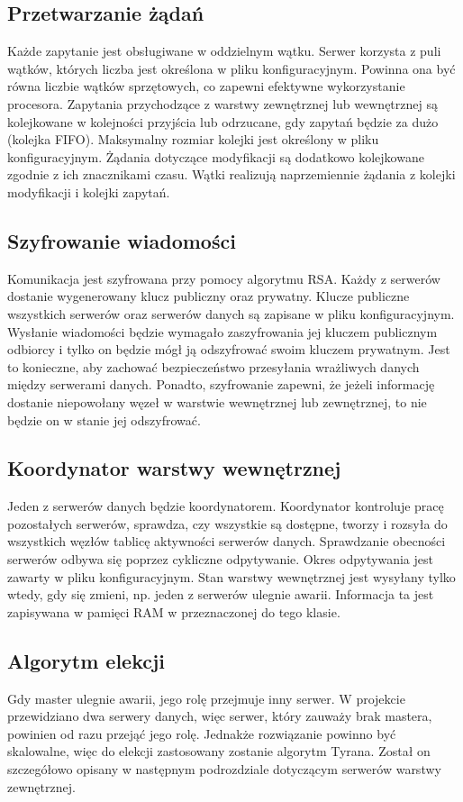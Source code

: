 \subsection{Przetwarzanie żądań}
Każde zapytanie jest obsługiwane w oddzielnym wątku. Serwer korzysta z puli wątków, których liczba jest określona w pliku konfiguracyjnym. Powinna ona być równa liczbie wątków sprzętowych, co zapewni efektywne wykorzystanie procesora. Zapytania przychodzące z warstwy zewnętrznej lub wewnętrznej są kolejkowane w kolejności przyjścia lub odrzucane, gdy zapytań będzie za dużo (kolejka FIFO). Maksymalny rozmiar kolejki jest określony w pliku konfiguracyjnym. Żądania dotyczące modyfikacji są dodatkowo kolejkowane zgodnie z ich znacznikami czasu. Wątki realizują naprzemiennie żądania z kolejki modyfikacji i kolejki zapytań.

\subsection{Szyfrowanie wiadomości}
Komunikacja jest szyfrowana przy pomocy algorytmu RSA. Każdy z serwerów dostanie wygenerowany klucz publiczny oraz prywatny. Klucze publiczne wszystkich serwerów oraz serwerów danych są zapisane w pliku konfiguracyjnym. Wysłanie wiadomości będzie wymagało zaszyfrowania jej kluczem publicznym odbiorcy i tylko on będzie mógł ją odszyfrować swoim kluczem prywatnym. Jest to konieczne, aby zachować bezpieczeństwo przesyłania wrażliwych danych między serwerami danych. Ponadto, szyfrowanie zapewni, że jeżeli informację dostanie niepowołany węzeł w warstwie wewnętrznej lub zewnętrznej, to nie będzie on w stanie jej odszyfrować.

\subsection{Koordynator warstwy wewnętrznej}
Jeden z serwerów danych będzie koordynatorem. Koordynator kontroluje pracę pozostałych serwerów, sprawdza, czy wszystkie są dostępne, tworzy i rozsyła do wszystkich węzłów tablicę aktywności serwerów danych. Sprawdzanie obecności serwerów odbywa się poprzez cykliczne odpytywanie. Okres odpytywania jest zawarty w pliku konfiguracyjnym. Stan warstwy wewnętrznej jest wysyłany tylko wtedy, gdy się zmieni, np. jeden z serwerów ulegnie awarii. Informacja ta jest zapisywana w pamięci RAM w przeznaczonej do tego klasie.

\subsection{Algorytm elekcji}
Gdy master ulegnie awarii, jego rolę przejmuje inny serwer. W projekcie przewidziano dwa serwery danych, więc serwer, który zauważy brak mastera, powinien od razu przejąć jego rolę. Jednakże rozwiązanie powinno być skalowalne, więc do elekcji zastosowany zostanie algorytm Tyrana. Został on szczegółowo opisany w następnym podrozdziale dotyczącym serwerów warstwy zewnętrznej.


